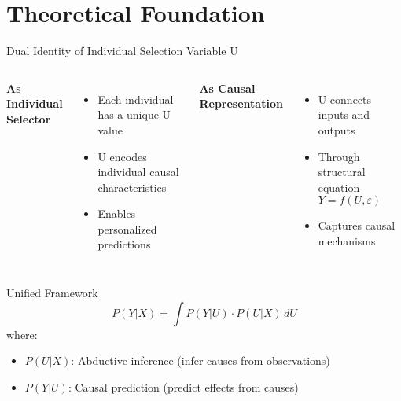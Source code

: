 \documentclass[aspectratio=169,10pt]{beamer}
\begin{document}
\section{Theoretical Foundation}

\begin{frame}{Dual Identity of Individual Selection Variable U}
\begin{columns}
\textbf{As Individual Selector}
\begin{itemize}
    \item Each individual has a unique U value
    \item U encodes individual causal characteristics
    \item Enables personalized predictions
\end{itemize}

\textbf{As Causal Representation}
\begin{itemize}
    \item U connects inputs and outputs
    \item Through structural equation $Y = f(U, \varepsilon)$
    \item Captures causal mechanisms
\end{itemize}
\end{columns}

\vspace{1em}
\begin{block}{Unified Framework}
$$P(Y|X) = \int P(Y|U) \cdot P(U|X) \, dU$$
where:
\begin{itemize}
    \item $P(U|X)$: Abductive inference (infer causes from observations)
    \item $P(Y|U)$: Causal prediction (predict effects from causes)
\end{itemize}
\end{block}
\end{frame}
\end{document}
